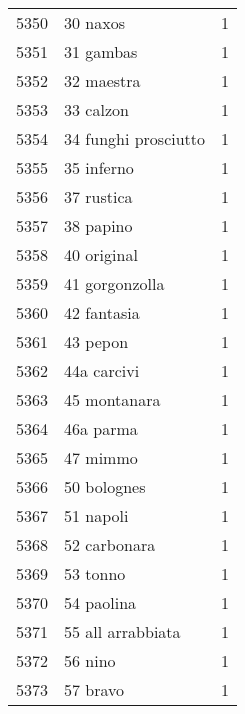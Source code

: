 \begin{tabular}{llr}
5350 &                                           30 naxos &      1 \\
5351 &                                          31 gambas &      1 \\
5352 &                                         32 maestra &      1 \\
5353 &                                          33 calzon &      1 \\
5354 &                               34 funghi prosciutto &      1 \\
5355 &                                         35 inferno &      1 \\
5356 &                                         37 rustica &      1 \\
5357 &                                          38 papino &      1 \\
5358 &                                        40 original &      1 \\
5359 &                                     41 gorgonzolla &      1 \\
5360 &                                        42 fantasia &      1 \\
5361 &                                           43 pepon &      1 \\
5362 &                                        44a carcivi &      1 \\
5363 &                                       45 montanara &      1 \\
5364 &                                          46a parma &      1 \\
5365 &                                           47 mimmo &      1 \\
5366 &                                        50 bolognes &      1 \\
5367 &                                          51 napoli &      1 \\
5368 &                                       52 carbonara &      1 \\
5369 &                                           53 tonno &      1 \\
5370 &                                         54 paolina &      1 \\
5371 &                                  55 all arrabbiata &      1 \\
5372 &                                            56 nino &      1 \\
5373 &                                           57 bravo &      1 \\

\end{tabular}
